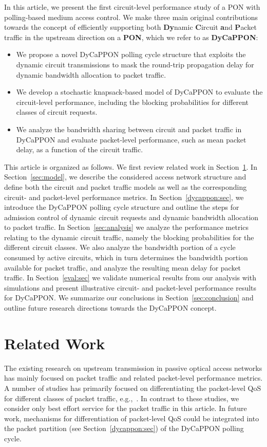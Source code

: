 \documentclass[article]{IEEEtran}
\begin{document}
In this article, we present the first circuit-level performance
study of a PON with polling-based medium access control.
We make three main original contributions towards the concept of efficiently
supporting both \textbf{Dy}namic \textbf{C}ircuit \textbf{a}nd \textbf{P}acket
traffic in the upstream
direction on a \textbf{PON}, which we refer to as \textbf{DyCaPPON}:
\begin{itemize}
\item We propose a novel DyCaPPON polling cycle structure that exploits
the dynamic circuit transmissions to mask the round-trip propagation delay
for dynamic bandwidth allocation to packet traffic.
\item We develop a stochastic knapsack-based model of DyCaPPON
to evaluate the circuit-level performance, including
the blocking probabilities for different classes of
circuit requests.
\item We analyze the bandwidth sharing between circuit and packet traffic
in DyCaPPON
and evaluate packet-level performance, such as mean packet delay,
as a function of the circuit traffic.
\end{itemize}

This article is organized as follows.
We first review related work in Section~\ref{lit:sec}.
In Section~\ref{sec:model}, we describe the considered
access network structure and define both the circuit and packet traffic models
as well as the corresponding circuit- and packet-level performance metrics.
In Section~\ref{dycappon:sec}, we introduce the DyCaPPON polling
cycle structure and outline the steps for admission control of
dynamic circuit requests and dynamic bandwidth allocation to packet traffic.
In Section~\ref{sec:analysis} we analyze the performance metrics
relating to the dynamic circuit traffic, namely the blocking
probabilities for the different circuit classes. We also
analyze the bandwidth portion of a cycle consumed by active circuits,
which in turn determines the bandwidth portion available for packet traffic,
and analyze the resulting mean delay for packet traffic.
In Section~\ref{eval:sec} we
validate numerical results from our analysis with simulations and present
illustrative circuit- and packet-level performance results for DyCaPPON.
We summarize our conclusions in Section~\ref{sec:conclusion}
and outline future research directions towards the DyCaPPON concept.


\section{Related Work}
\label{lit:sec}
The existing research on upstream transmission in
passive optical access networks has mainly focused on
packet traffic and related packet-level performance metrics.
A number of studies has primarily focused on
differentiating the packet-level QoS for different classes
of packet traffic,
e.g.,~\cite{AnLA04,AsYDA03,DiDLC11,GhSA04,LuAn05,RaM09,
ShHEAA04,ShBGAM05,VaGh11}.
In contrast to these studies, we consider only best effort service
for the packet traffic in this article.
In future work, mechanisms for differentiation of packet-level QoS
could be integrated into the packet partition
(see Section~\ref{dycappon:sec}) of the DyCaPPON polling cycle.
\end{document}
